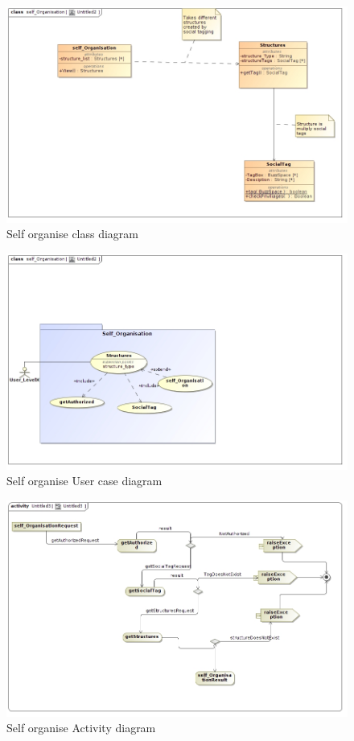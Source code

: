\documentclass[11pt]{article}
\begin{document}
\begin{enumerate}
\begin{figure}[H]	
\graphicspath{ {../Diagrams/sfiso/} }
    	\includegraphics[scale=0.5]{selfC.jpg}
    	\caption{Self organise class diagram}
	\end{figure}

\begin{figure}[H]	
\graphicspath{ {../Diagrams/sfiso/} }
    	\includegraphics[scale=0.5]{self.jpg}
    	\caption{Self organise User case diagram}
	\end{figure}

\begin{figure}[H]	
\graphicspath{ {../Diagrams/sfiso/} }
    	\includegraphics[scale=0.5]{selfA.jpg}
    	\caption{Self organise Activity diagram}
	\end{figure}


\end{enumerate}
\end{document}
